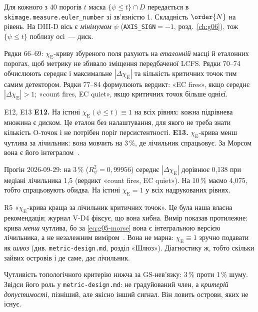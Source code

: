 Для кожного з 40 порогів $t$ маска $\{\psi\le t\}\cap D$ передається в \texttt{skimage.measure.euler\_number} зі зв'язністю 1. Складність $\order{N}$ на рівень. На DIII-D вісь є \emph{мінімумом} $\psi$ (\texttt{AXIS\_SIGN}$=-1$, розд.~\ref{ch:g06}), тож $\{\psi\le t\}$ поблизу осі~--- диск.


Рядки 66--69: $\chi_{\mathrm E}$-криву збуреного поля рахують на \emph{еталонній} масці й еталонних порогах, щоб метрику не збивало зміщення передбаченої LCFS. Рядки 70--74 обчислюють середнє і максимальне $|\Delta\chi_{\mathrm E}|$ та кількість критичних точок тим самим детектором. Рядки 77--84 формулюють вердикт: «EC fires», якщо середнє $|\Delta\chi_{\mathrm E}|>1$; «count fires, EC quiet», якщо критичних точок більше однієї.

\begin{established}{E12, E13}
\textbf{E12.} На істині $\chi_{\mathrm E}(\psi\le t)\equiv1$ на всіх рівнях: кожна підрівнева множина є диском. Це еталон без налаштування, для якого не треба знати кількість O-точок і не потрібен поріг персистентності.
\textbf{E13.} $\chi_{\mathrm E}$-крива менш чутлива за лічильник: вона мовчить на 3\,\%, де лічильник спрацьовує. За Морсом вона є його інтегралом~\cite{RegEst}.
\end{established}

Прогін 2026-09-29: на 3\,\% ($R^2_\psi=0{,}99956$) середнє $|\Delta\chi_{\mathrm E}|$ дорівнює 0,138 при медіані лічильника 1,5 (вердикт «count fires, EC quiet»). На 10\,\% маємо 4,075, тобто спрацьовують обидва. На істині $\chi_{\mathrm E}=1$ у всіх надрукованих рівнях.

\begin{refuted}{R5}
«$\chi_{\mathrm E}$-крива краща за лічильник критичних точок». Це була наша власна рекомендація; журнал V-D4 фіксує, що вона хибна. Вимір показав протилежне: крива \emph{менш} чутлива, бо за \eqref{eq:g05-morse} вона є інтегральною версією лічильника, а не незалежним виміром~\cite{RegEst,RegVerif}. Вона не марна: $\chi_{\mathrm E}\equiv1$ зручно подавати як \emph{шлюз} (див. \texttt{metric-design.md}, розділ «Шлюз»). Діагностику ж, тобто скільки зайвих островів і де саме, дає лічильник.
\end{refuted}

Чутливість топологічного критерію нижча за GS-нев'язку: 3\,\% проти 1\,\% шуму. Звідси його роль у \texttt{metric-design.md}: не градуйований член, а \emph{критерій допустимості}, пізніший, але якісно інший сигнал. Він ловить острови, яких не існує.


